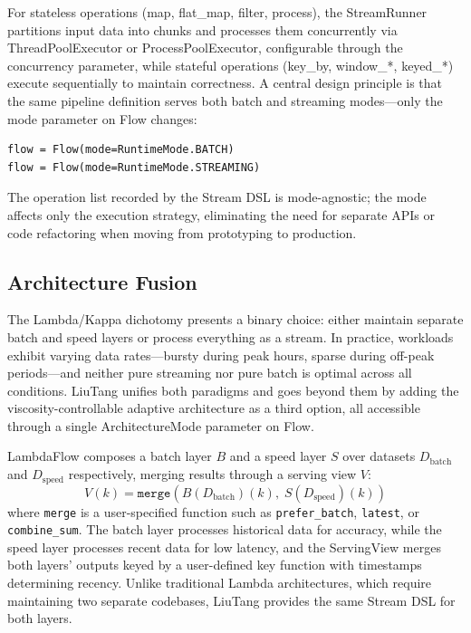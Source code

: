\documentclass[conference]{IEEEtran}
\begin{document}
For stateless operations (map, flat\_map, filter, process), the StreamRunner partitions input data into chunks and processes them concurrently via ThreadPoolExecutor or ProcessPoolExecutor, configurable through the concurrency parameter, while stateful operations (key\_by, window\_*, keyed\_*) execute sequentially to maintain correctness. A central design principle is that the same pipeline definition serves both batch and streaming modes---only the mode parameter on Flow changes:

\begin{lstlisting}
flow = Flow(mode=RuntimeMode.BATCH)
flow = Flow(mode=RuntimeMode.STREAMING)
\end{lstlisting}

The operation list recorded by the Stream DSL is mode-agnostic; the mode affects only the execution strategy, eliminating the need for separate APIs or code refactoring when moving from prototyping to production.

\subsection{Architecture Fusion}

The Lambda/Kappa dichotomy presents a binary choice: either maintain separate batch and speed layers or process everything as a stream. In practice, workloads exhibit varying data rates---bursty during peak hours, sparse during off-peak periods---and neither pure streaming nor pure batch is optimal across all conditions. LiuTang unifies both paradigms and goes beyond them by adding the viscosity-controllable adaptive architecture as a third option, all accessible through a single ArchitectureMode parameter on Flow.

LambdaFlow composes a batch layer $B$ and a speed layer $S$ over datasets $D_{\text{batch}}$ and $D_{\text{speed}}$ respectively, merging results through a serving view $V$:
\begin{equation}
V(k) = \texttt{merge}(B(D_{\text{batch}})(k),\; S(D_{\text{speed}})(k))
\end{equation}
where \texttt{merge} is a user-specified function such as \texttt{prefer\_batch}, \texttt{latest}, or \texttt{combine\_sum}. The batch layer processes historical data for accuracy, while the speed layer processes recent data for low latency, and the ServingView merges both layers' outputs keyed by a user-defined key function with timestamps determining recency. Unlike traditional Lambda architectures, which require maintaining two separate codebases, LiuTang provides the same Stream DSL for both layers.
\end{document}
